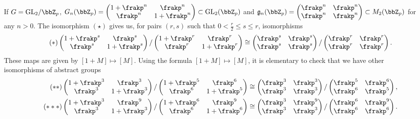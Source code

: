\documentclass[10pt]{alggeom}
\renewcommand{\leq}{\leqslant}
\theoremstyle{definition}
\numberwithin{equation}{section}
\begin{document}
If $G =  \mathrm{GL}_2 /\bbZ_p $, $G_n (\bbZ_p) =\begin{pmatrix}1+\frakp^n & \frakp^n\\ \frakp^n & 1+ \frakp^n    \end{pmatrix} \subset \mathrm{GL}_2 (\bbZ _p) $ and $\mathfrak{g} _n (\bbZ_p)=\begin{pmatrix}\frakp^n & \frakp^n \\ \frakp^n & \frakp^n  \end{pmatrix} \subset M_2 (\bbZ_p)$ for any $n>0$. The isomorphism $(\star)$ gives us, for pairs $(r,s)$ such that $0 < \frac{r}{2} \leq s \leq r $, isomorphisms
\[ \tag{$ * $} \begin{pmatrix}1+\frakp^s & \frakp^s\\ \frakp^s & 1+ \frakp^s    \end{pmatrix} /  \begin{pmatrix}1+\frakp^r & \frakp^r \\ \frakp^r & 1+ \frakp^r \end{pmatrix} \cong \begin{pmatrix}\frakp^s & \frakp^s \\ \frakp^s &  \frakp^s  \end{pmatrix} /  \begin{pmatrix}\frakp^r & \frakp^r \\ \frakp^r &  \frakp^r \end{pmatrix}.\]  These maps are given by $[1+M] \mapsto [M]$. Using the formula $ [1+M] \mapsto [M] $, it is elementary to check that we have other isomorphisms of abstract groups
 \begin{align*} \tag{$ ** $} \begin{pmatrix}1+\frakp^3 & \frakp^3\\ \frakp^3 & 1+ \frakp^3 \end{pmatrix} /  \begin{pmatrix}1+\frakp^5 & \frakp^6 \\ \frakp^6 & 1+ \frakp^5 \end{pmatrix} \cong  \begin{pmatrix}\frakp^3 & \frakp^3 \\ \frakp^3 &  \frakp^3  \end{pmatrix} /  \begin{pmatrix}\frakp^5 & \frakp^6 \\ \frakp^6 &  \frakp^5 \end{pmatrix},\\
 \tag{$***$}\begin{pmatrix}1+\frakp^3 & \frakp^9\\ \frakp^3 & 1+ \frakp^3 \end{pmatrix} /  \begin{pmatrix}1+\frakp^6 & \frakp^9 \\ \frakp^6 & 1+ \frakp^6 \end{pmatrix} \cong  \begin{pmatrix}\frakp^3 & \frakp^9 \\ \frakp^3 &  \frakp^3  \end{pmatrix} /  \begin{pmatrix}\frakp^6 & \frakp^9 \\ \frakp^6 &  \frakp^6 \end{pmatrix}.
 \end{align*}
\end{document}
